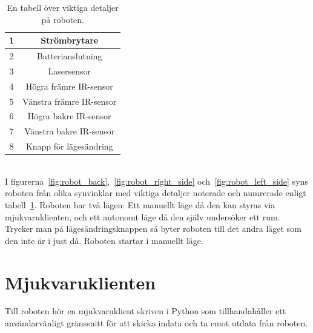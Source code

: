 \documentclass{article}
\begin{document}
\begin{table}[H]
\centering
\caption{En tabell över viktiga detaljer på roboten.}
\begin{tabular}{ | c | c | }
\hline
1 & Strömbrytare \\
\hline
2 & Batterianslutning \\
\hline
3 & Lasersensor \\
\hline
4 & Högra främre IR-sensor \\
\hline
5 & Vänstra främre IR-sensor \\
\hline
6 & Högra bakre IR-sensor \\
\hline
7 & Vänstra bakre IR-sensor \\
\hline
8 & Knapp för lägesändring \\
\hline
\end{tabular}
\label{table:components}
\end{table}
\ \\
I figurerna~\ref{fig:robot_back},~\ref{fig:robot_right_side} och~\ref{fig:robot_left_side} syns roboten från olika synvinklar med viktiga detaljer noterade och numrerade enligt tabell~\ref{table:components}. Roboten har två lägen: Ett manuellt läge då den kan styras via mjukvaruklienten, och ett autonomt läge då den själv undersöker ett rum. Trycker man på lägesändringsknappen så byter roboten till det andra läget som den inte är i just då. Roboten startar i manuellt läge. \newline\newline

\clearpage
\section{Mjukvaruklienten}
Till roboten hör en mjukvaruklient skriven i Python som tillhandahåller ett användarvänligt gränssnitt för att skicka indata och ta emot utdata från roboten.
\end{document}
